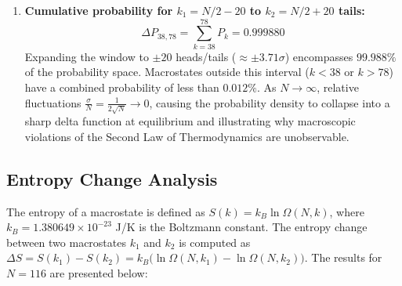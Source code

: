 \documentclass[11pt, a4paper]{article}
\begin{document}
\begin{enumerate}[label=\alph*)]
    \vspace{0.3cm}
    \item \textbf{Cumulative probability for $k_1 = N/2 - 20$ to $k_2 = N/2 + 20$ tails:}
    \begin{equation} \Delta P_{38, 78} = \sum_{k=38}^{78} P_k = 0.999880 \end{equation}
    Expanding the window to $\pm 20$ heads/tails ($\approx \pm 3.71\sigma$) encompasses $99.988\%$ of the probability space.
    Macrostates outside this interval ($k < 38$ or $k > 78$) have a combined probability of less than $0.012\%$. As $N \to \infty$, relative fluctuations $\frac{\sigma}{N} = \frac{1}{2\sqrt{N}} \to 0$, causing the probability density to collapse into a sharp delta function at equilibrium and illustrating why macroscopic violations of the Second Law of Thermodynamics are unobservable.
    
\end{enumerate}
\subsection{Entropy Change Analysis}
The entropy of a macrostate is defined as $S(k) = k_B \ln \Omega(N, k)$, where $k_B = 1.380649 \times 10^{-23}$ J/K is the Boltzmann constant. The entropy change between two macrostates $k_1$ and $k_2$ is computed as $\Delta S = S(k_1) - S(k_2) = k_B \bigl(\ln \Omega(N,k_1) - \ln \Omega(N,k_2)\bigr)$. The results for $N = 116$ are presented below:
\end{document}
